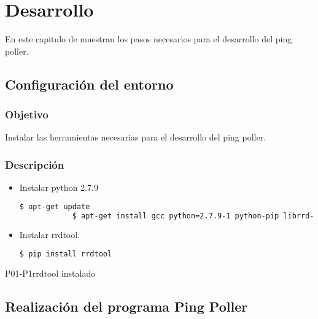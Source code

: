 \section{Desarrollo}
En este capitulo de muestran los pasos necesarios para el desarrollo del ping poller.


\subsection{Configuración del entorno}

\subsubsection{Objetivo}
Instalar las herramientas necesarias para el desarrollo del ping poller.

\subsubsection{Descripción}
\begin{itemize}
	\item Instalar python 2.7.9\\
		\begin{lstlisting}[language=bash]
			$ apt-get update
			$ apt-get install gcc python=2.7.9-1 python-pip librrd-dev libpython-dev
		\end{lstlisting}
	\item Instalar rrdtool.\\
		\begin{lstlisting}[language=bash]
			$ pip install rrdtool
		\end{lstlisting}
\end{itemize}

\newpage
\begin{prueba}{P01-P1}{rrdtool instalado}
\end{prueba}


\subsection{Realización del programa Ping Poller}

